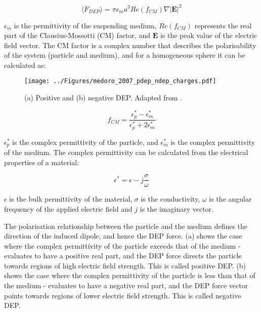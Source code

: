 \begin{equation}
 \langle F_{DEP} \rangle = \pi \epsilon_{m} a^{3} Re(f_{CM}) \nabla |\textbf{E}|^{2}
\label{eqn:dep_force}
\end{equation}

$\epsilon_{m}$ is the permittivity of the suspending medium, $Re(f_{CM})$ represents the real part of the Clausius-Mossotti (CM) factor, and $\textbf{E}$ is the peak value of the electric field vector. The CM factor is a complex number that describes the polarisability of the system (particle and medium), and for a homogeneous sphere it can be calculated as:


\begin{figure}[t]
 \centering
 \texttt{[image: ../Figures/medoro\_2007\_pdep\_ndep\_charges.pdf]}
 \caption[Positive and negative DEP.]{(a) Positive and (b) negative DEP. Adapted from \cite{Medoro:2007}.}
 \label{fig:medoro_2007_pdep_ndep_charges}
\end{figure}

\begin{equation}
 f_{CM} =  \frac{\epsilon_{p}^{*}-\epsilon_{m}^{*}}{\epsilon_{p}^{*}+2\epsilon_{m}^{*}}
\label{eqn:CM_factor}
\end{equation}

$\epsilon_{p}^{*}$ is the complex permittivity of the particle, and $\epsilon_{m}^{*}$ is the complex permittivity of the medium. The complex permittivity can be calculated from the electrical properties of a material:

\begin{equation}
 \epsilon^{*} = \epsilon - j \frac{\sigma}{\omega}
\label{eqn:complex_permittivity}
\end{equation}

$\epsilon$ is the bulk permittivity of the material, $\sigma$ is the conductivity, $\omega$ is the angular frequency of the applied electric field and $j$ is the imaginary vector.

The polarisation relationship between the particle and the medium defines the direction of the induced dipole, and hence the DEP force.  (a) shows the case where the complex permittivity of the particle exceeds that of the medium -  evaluates to have a positive real part, and the DEP force directs the particle towards regions of high electric field strength. This is called positive DEP.  (b) shows the case where the complex permittivity of the particle is less than that of the medium -  evaluates to have a negative real part, and the DEP force vector points towards regions of lower electric field strength. This is called negative DEP.

